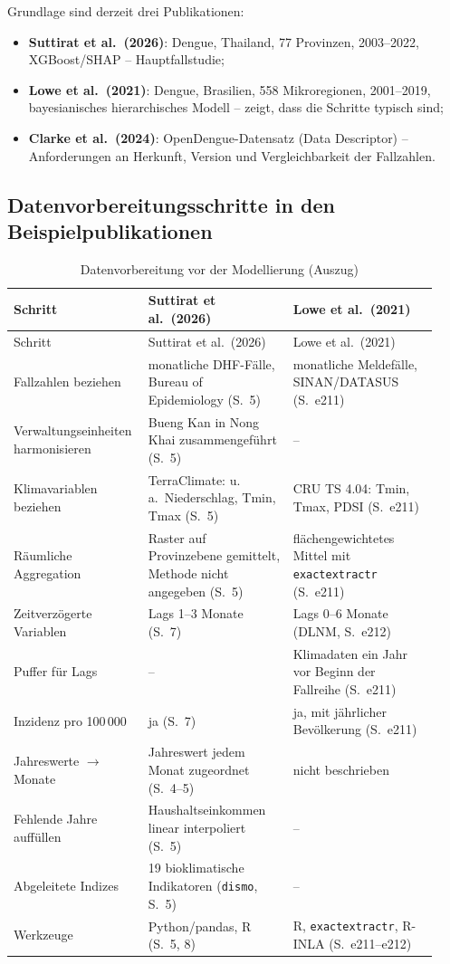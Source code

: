 \documentclass[11pt,a4paper]{article}
\begin{document}
Grundlage sind derzeit drei Publikationen:
\begin{itemize}[nosep]
  \item \textbf{Suttirat et al.\ (2026)}: Dengue, Thailand, 77 Provinzen,
        2003--2022, XGBoost/SHAP -- Hauptfallstudie;
  \item \textbf{Lowe et al.\ (2021)}: Dengue, Brasilien, 558 Mikroregionen,
        2001--2019, bayesianisches hierarchisches Modell -- zeigt, dass die
        Schritte typisch sind;
  \item \textbf{Clarke et al.\ (2024)}: OpenDengue-Datensatz (Data Descriptor) --
        Anforderungen an Herkunft, Version und Vergleichbarkeit der Fallzahlen.
\end{itemize}

\subsection{Datenvorbereitungsschritte in den Beispielpublikationen}

\begin{longtable}{@{}p{0.27\linewidth}p{0.33\linewidth}p{0.33\linewidth}@{}}
\caption{Datenvorbereitung vor der Modellierung (Auszug)}\label{tab:schritte}\\
\toprule
Schritt & Suttirat et al.\ (2026) & Lowe et al.\ (2021) \\
\midrule
\endfirsthead
\toprule
Schritt & Suttirat et al.\ (2026) & Lowe et al.\ (2021) \\
\midrule
\endhead
Fallzahlen beziehen & monatliche DHF-Fälle, Bureau of Epidemiology (S.~5) &
  monatliche Meldefälle, SINAN/DATASUS (S.~e211) \\
Verwaltungseinheiten harmonisieren & Bueng Kan in Nong Khai zusammengeführt (S.~5) & -- \\
Klimavariablen beziehen & TerraClimate: u.\,a.\ Niederschlag, Tmin, Tmax (S.~5) &
  CRU TS 4.04: Tmin, Tmax, PDSI (S.~e211) \\
Räumliche Aggregation & Raster auf Provinzebene gemittelt, Methode nicht angegeben (S.~5) &
  flächengewichtetes Mittel mit \texttt{exactextractr} (S.~e211) \\
Zeitverzögerte Variablen & Lags 1--3 Monate (S.~7) & Lags 0--6 Monate (DLNM, S.~e212) \\
Puffer für Lags & -- & Klimadaten ein Jahr vor Beginn der Fallreihe (S.~e211) \\
Inzidenz pro 100\,000 & ja (S.~7) & ja, mit jährlicher Bevölkerung (S.~e211) \\
Jahreswerte $\rightarrow$ Monate & Jahreswert jedem Monat zugeordnet (S.~4--5) &
  nicht beschrieben \\
Fehlende Jahre auffüllen & Haushaltseinkommen linear interpoliert (S.~5) & -- \\
Abgeleitete Indizes & 19 bioklimatische Indikatoren (\texttt{dismo}, S.~5) & -- \\
Werkzeuge & Python/pandas, R (S.~5, 8) & R, \texttt{exactextractr}, R-INLA (S.~e211--e212) \\
\bottomrule
\end{longtable}
\end{document}

